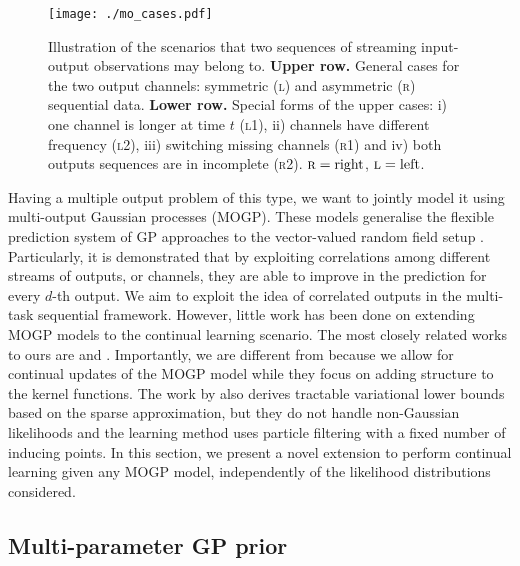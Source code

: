 \documentclass[]{article}
\begin{document}
\begin{figure}[ht]
	\centering
	\texttt{[image: ./mo\_cases.pdf]}
	\caption{Illustration of the scenarios that two sequences of streaming input-output observations may belong to. \textbf{Upper row.} General cases for the two output channels: symmetric (\textsc{l}) and asymmetric (\textsc{r}) sequential data. \textbf{Lower row.} Special forms of the upper cases: i) one channel is longer at time $t$ (\textsc{l1}), ii) channels have different frequency (\textsc{l2}), iii) switching missing channels (\textsc{r1}) and iv) both outputs sequences are in incomplete (\textsc{r2}). $\textsc{r}=\text{right}$, $\textsc{l}=\text{left}$.}
	\label{fig:mo_cases}
\end{figure}

Having a multiple output problem of this type, we want to jointly model it using multi-output Gaussian processes (MOGP). These models generalise the flexible prediction system of GP approaches to the vector-valued random field setup \citep{alvarez2012kernels}. Particularly, it is demonstrated that by exploiting correlations among different streams of outputs, or channels, they are able to improve in the prediction for every $d$-th output. We aim to exploit the idea of correlated outputs in the multi-task sequential framework. However, little work has been done on extending MOGP models to the continual learning scenario. The most closely related works to ours are \citet{cheng2017sparse} and \citet{yang2018online}. Importantly, we are different from \citet{cheng2017sparse} because we allow for continual updates of the MOGP model while they focus on adding structure to the kernel functions. The work by \citet{yang2018online} also derives tractable variational lower bounds based on the sparse approximation, but they do not handle non-Gaussian likelihoods and the learning method uses particle filtering with a fixed number of inducing points. In this section, we present a novel extension to perform continual learning given any MOGP model, independently of the likelihood distributions considered.

\subsection{Multi-parameter GP prior}
\end{document}
